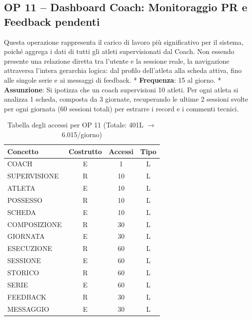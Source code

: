 \documentclass[12pt]{report}
\begin{document}
\subsection*{OP 11 – Dashboard Coach: Monitoraggio PR e Feedback pendenti}
Questa operazione rappresenta il carico di lavoro più significativo per il sistema, poiché aggrega i dati di tutti gli atleti supervisionati dal Coach. Non essendo presente una relazione diretta tra l'utente e la sessione reale, la navigazione attraversa l'intera gerarchia logica: dal profilo dell'atleta alla scheda attiva, fino alle singole serie e ai messaggi di feedback.
* \textbf{Frequenza}: 15 al giorno.
* \textbf{Assunzione}: Si ipotizza che un coach supervisioni 10 atleti. Per ogni atleta si analizza 1 scheda, composta da 3 giornate, recuperando le ultime 2 sessioni svolte per ogni giornata (60 sessioni totali) per estrarre i record e i commenti tecnici.

\begin{table}[H]
\centering
\begin{tabular}{|l|c|c|c|}
\hline
\textbf{Concetto} & \textbf{Costrutto} & \textbf{Accessi} & \textbf{Tipo} \\ \hline
COACH             & E                  & 1                & L             \\ \hline
SUPERVISIONE      & R                  & 10               & L             \\ \hline
ATLETA            & E                  & 10               & L             \\ \hline
POSSESSO          & R                  & 10               & L             \\ \hline
SCHEDA            & E                  & 10               & L             \\ \hline
COMPOSIZIONE      & R                  & 30               & L             \\ \hline
GIORNATA          & E                  & 30               & L             \\ \hline
ESECUZIONE        & R                  & 60               & L             \\ \hline
SESSIONE          & E                  & 60               & L             \\ \hline
STORICO           & R                  & 60               & L             \\ \hline
SERIE             & E                  & 60               & L             \\ \hline
FEEDBACK          & R                  & 30               & L             \\ \hline
MESSAGGIO         & E                  & 30               & L             \\ \hline
\end{tabular}
\caption{Tabella degli accessi per OP 11 (Totale: 401L $\rightarrow$ 6.015/giorno)}
\end{table}
\end{document}
